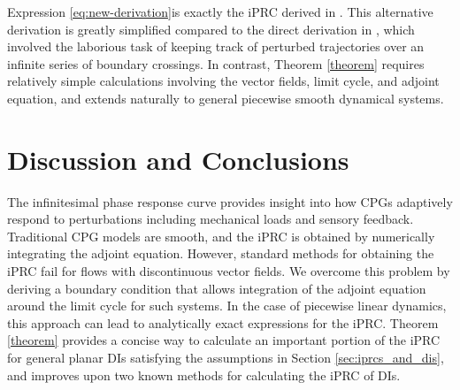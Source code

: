 \documentclass[12pt]{article}
\begin{document}
Expression \eqref{eq:new-derivation}is exactly the iPRC derived in \cite{ShawParkChielThomas2012SIADS}.  This alternative derivation is greatly simplified compared to the direct derivation in \cite{ShawParkChielThomas2012SIADS}, which involved the laborious task of keeping track of perturbed trajectories over an infinite series of boundary crossings.  In contrast, Theorem \ref{theorem} requires relatively simple calculations involving the vector fields, limit cycle, and adjoint equation, and extends naturally to general piecewise smooth dynamical systems.



\section{Discussion and Conclusions}
The infinitesimal phase response curve provides insight into how CPGs adaptively respond to perturbations including mechanical loads and sensory feedback.  Traditional CPG models are smooth, and the iPRC is obtained by numerically integrating the adjoint equation.  However, standard methods for obtaining the iPRC fail for flows with discontinuous vector fields.  We overcome this problem by deriving a boundary condition that allows integration of the adjoint equation around the limit cycle for such systems.  In the case of piecewise linear dynamics, this approach can lead to analytically exact expressions for the iPRC. Theorem \ref{theorem} provides a concise way to calculate an important portion of the iPRC for general planar DIs satisfying the assumptions in Section \ref{sec:iprcs_and_dis}, and improves upon two known methods for calculating the iPRC of DIs.

\end{document}
